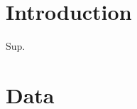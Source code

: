 \documentclass[modern]{aastex63}
\newcommand{\gaia}{\textsl{Gaia}}
\newcommand{\dr}[1]{\acronym{DR}#1}
\newcommand{\apogee}{\acronym{APOGEE}}
\newcommand{\sdssiv}{\acronym{SDSS-IV}}
\begin{document}
\section{Introduction}
\label{sec:intro}

Sup.


\section{Data}
\label{sec:data}



\end{document}

